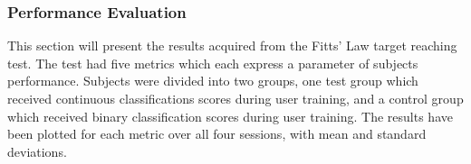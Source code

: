 \begin{multicols}{2}
\subsubsection*{Performance Evaluation} \label{sec:R:fitts}
This section will present the results acquired from the Fitts' Law target reaching test. The test had five metrics which each express a parameter of subjects performance. Subjects were divided into two groups, one test group which received continuous classifications scores during user training, and a control group which received binary classification scores during user training. The results have been plotted for each metric over all four sessions, with mean and standard deviations.
\end{multicols}




\begin{figure}[H] 
\end{figure}


\begin{figure}[H] 
	\centering

\end{figure}


